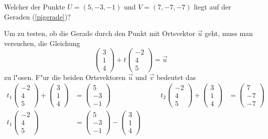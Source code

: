\begin{beispiel} Welcher der Punkte $U=(5,-3,-1)$ und $V=(7,-7,-7)$
liegt auf der Geraden (\ref{pigerade})?

\smallskip

{\parindent 0pt Um zu testen},
ob die Gerade durch den Punkt mit Ortsvektor $\vec u$
geht, muss man versuchen, die Gleichung
\[
\begin{pmatrix}3\\1\\4 \end{pmatrix}
+t
\begin{pmatrix}-2\\4\\5\end{pmatrix}
=\vec u
\]
zu l"osen.
F"ur die beiden Ortsvektoren $\vec u$ und $\vec v$
bedeutet das
\begin{align*}
t_1
\begin{pmatrix}-2\\4\\5\end{pmatrix}
+
\begin{pmatrix}3\\1\\4 \end{pmatrix}
&=
\begin{pmatrix}5\\-3\\-1\end{pmatrix}
&
\qquad
t_2
\begin{pmatrix}-2\\4\\5\end{pmatrix}
+
\begin{pmatrix}3\\1\\4 \end{pmatrix}
&=
\begin{pmatrix}7\\-7\\-7\end{pmatrix}
\\
t_1
\begin{pmatrix}-2\\4\\5\end{pmatrix}
&=
\begin{pmatrix}5\\-3\\-1\end{pmatrix}
-
\begin{pmatrix}3\\1\\4 \end{pmatrix}

\end{align*}
\end{beispiel}
